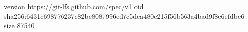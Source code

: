 version https://git-lfs.github.com/spec/v1
oid sha256:6431c698776237c82be8087996ed7c5dca480c215f56b563a4bad9f8e6efdbe6
size 87540
